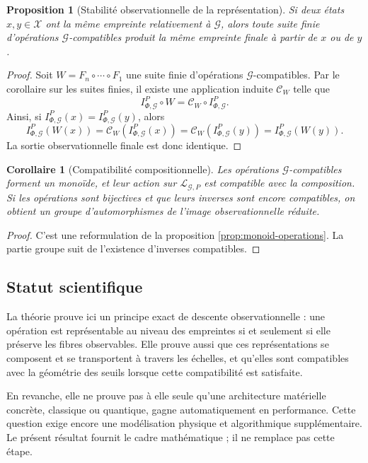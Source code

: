 \documentclass[11pt,a4paper]{article}
\newtheorem{proposition}{Proposition}
\newtheorem{corollary}{Corollaire}
\begin{document}
\begin{appendices}
\begin{proposition}[Stabilité observationnelle de la représentation]
Si deux états \(x,y\in\mathcal X\) ont la même empreinte relativement à \(\mathcal G\), alors toute suite finie d'opérations \(\mathcal G\)-compatibles produit la même empreinte finale à partir de \(x\) ou de \(y\).
\end{proposition}

\begin{proof}
Soit \(W=F_n\circ\cdots\circ F_1\) une suite finie d'opérations \(\mathcal G\)-compatibles. Par le corollaire sur les suites finies, il existe une application induite \(\mathcal C_W\) telle que
\[
I_{\Phi,\mathcal G}^P\circ W=\mathcal C_W\circ I_{\Phi,\mathcal G}^P.
\]
Ainsi, si \(I_{\Phi,\mathcal G}^P(x)=I_{\Phi,\mathcal G}^P(y)\), alors
\[
I_{\Phi,\mathcal G}^P(W(x))
=
\mathcal C_W(I_{\Phi,\mathcal G}^P(x))
=
\mathcal C_W(I_{\Phi,\mathcal G}^P(y))
=
I_{\Phi,\mathcal G}^P(W(y)).
\]
La sortie observationnelle finale est donc identique.
\end{proof}

\begin{corollary}[Compatibilité compositionnelle]
Les opérations \(\mathcal G\)-compatibles forment un monoïde, et leur action sur \(\mathcal L_{\mathcal G,P}\) est compatible avec la composition. Si les opérations sont bijectives et que leurs inverses sont encore compatibles, on obtient un groupe d'automorphismes de l'image observationnelle réduite.
\end{corollary}

\begin{proof}
C'est une reformulation de la proposition \ref{prop:monoid-operations}. La partie groupe suit de l'existence d'inverses compatibles.
\end{proof}

\subsection{Statut scientifique}

La théorie prouve ici un principe exact de descente observationnelle : une opération est représentable au niveau des empreintes si et seulement si elle préserve les fibres observables. Elle prouve aussi que ces représentations se composent et se transportent à travers les échelles, et qu'elles sont compatibles avec la géométrie des seuils lorsque cette compatibilité est satisfaite.

En revanche, elle ne prouve pas à elle seule qu'une architecture matérielle concrète, classique ou quantique, gagne automatiquement en performance. Cette question exige encore une modélisation physique et algorithmique supplémentaire. Le présent résultat fournit le cadre mathématique ; il ne remplace pas cette étape.

\end{appendices}
\end{document}
